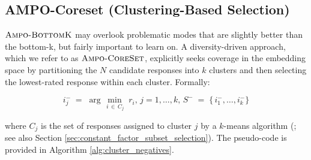 
\vspace{-0.1in}
\subsection{AMPO-Coreset (Clustering-Based Selection)}
\label{sec:ampo_coreset}

\vspace{-0.05in}
\noindent
$\textsc{Ampo-BottomK}$ may overlook problematic modes that are slightly better than the bottom-k, but fairly important to learn on. A diversity-driven approach, which we refer to as $\textsc{Ampo-CoreSet}$, explicitly seeks coverage in the embedding space by partitioning the $N$ candidate responses into $k$ clusters and then selecting the lowest-rated response within each cluster. Formally:

\vspace{-0.15in}
\[
\label{eq:clustering_negatives}
i^-_j 
\;=\;
\arg\min_{\,i \,\in\,C_j}\; r_i, 
\,
j = 1,\dots,k, 
\,
S^- \;=\;\bigl\{\,i^-_1,\dots,i^-_k\bigr\}
\]

\vspace{-0.15in}
where $C_j$ is the set of responses assigned to cluster $j$ by a $k$-means algorithm (\citealt{har2004coresets,cohen2022improved}; see also Section \ref{sec:constant_factor_subset_selection}). The pseudo-code is provided in Algorithm \ref{alg:cluster_negatives}.



